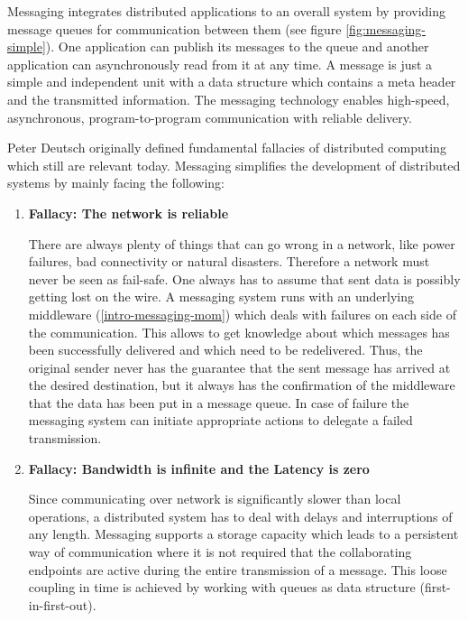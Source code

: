 Messaging integrates distributed applications to an overall system by providing
message queues for communication between them (see figure
\ref{fig:messaging-simple}). One application can publish its messages to the
queue and another application can asynchronously read from it at any time.
A message is just a simple and independent unit with a data structure
which contains a meta header and the transmitted information. The messaging
technology enables high-speed, asynchronous, program-to-program communication
with reliable delivery.

\newpage
Peter Deutsch originally defined fundamental fallacies of distributed computing
which still are relevant today.\cite{fallaciesOfDs} Messaging
simplifies the development of distributed systems by mainly facing the
following:

\begin{enumerate}
    \item{\textbf{Fallacy: The network is reliable}

        There are always plenty of things that can go wrong in a network, like
        power failures, bad connectivity or natural disasters. Therefore a
        network must never be seen as fail-safe. One always has to assume that
        sent data is possibly getting lost on the wire. A messaging system runs
        with an underlying middleware (\ref{intro-messaging-mom}) which deals
        with failures on each side of the communication. This allows to get
        knowledge about which messages has been successfully delivered and which
        need to be redelivered. Thus, the original sender never has the guarantee
        that the sent message has arrived at the desired destination, but it
        always has the confirmation of the middleware that the data has been put 
        in a message queue. In case of failure the messaging system can initiate
        appropriate actions to delegate a failed transmission.

      }

    \item{\textbf{Fallacy: Bandwidth is infinite and the Latency is zero }

        Since communicating over network is significantly slower than local
        operations, a distributed system has to deal with delays and
        interruptions of any length. Messaging supports a storage capacity which
        leads to a persistent way of communication where it is not required that
        the collaborating endpoints are active during the entire transmission of
        a message. This loose coupling in time is achieved by working with
        queues as data structure (first-in-first-out).

}
\end{enumerate}
